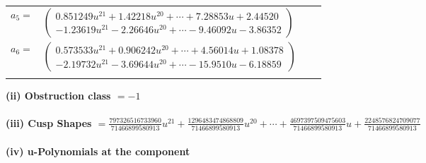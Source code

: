 \documentclass[1p]{elsarticle_modified}
\theoremstyle{definition}
\begin{document}
\begin{tabular}{m{7pt} m{180pt} m{7pt} m{180pt} }
\flushright $a_{5}=$&$\begin{pmatrix}0.851249 u^{21}+1.42218 u^{20}+\cdots+7.28853 u+2.44520\\-1.23619 u^{21}-2.26646 u^{20}+\cdots-9.46092 u-3.86352\end{pmatrix}$ \\
\flushright $a_{6}=$&$\begin{pmatrix}0.573533 u^{21}+0.906242 u^{20}+\cdots+4.56014 u+1.08378\\-2.19732 u^{21}-3.69644 u^{20}+\cdots-15.9510 u-6.18859\end{pmatrix}$\\&\end{tabular}
\flushleft \textbf{(ii) Obstruction class $= -1$}\\~\\
\flushleft \textbf{(iii) Cusp Shapes $= \frac{797326516733960}{71466899580913} u^{21}+\frac{1296483474868809}{71466899580913} u^{20}+\cdots+\frac{4697397509475603}{71466899580913} u+\frac{2248576824709077}{71466899580913}$}\\~\\
\newpage\renewcommand{\arraystretch}{1}
\flushleft \textbf{(iv) u-Polynomials at the component}\newline \\
\end{document}
